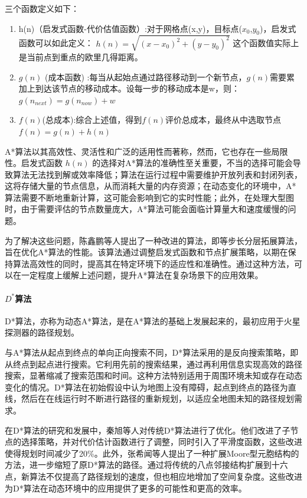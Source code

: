 \documentclass{report}
\begin{document}
三个函数定义如下：
\begin{enumerate}
\item 	h(n)（启发式函数-代价估值函数）:对于网格点(x,y)，目标点($x_0$,$y_0$)，启发式函数可以如此定义： \( h(n)=\sqrt{(x-x_0)^2+(y-y_0)^2} \) 这个函数值实际上是当前点到重点的欧里几得距离。
\item $g(n)$ (成本函数) :每当从起始点通过路径移动到一个新节点，$g(n)$需要累加上到达该节点的移动成本。设每一步的移动成本是w，则：$g(n_{next})=g(n_{now})+w$
  \item  $f(n)$(总成本):综合上述值，得到$f(n)$评价总成本，最终从中选取节点$f(n)=g(n)+h(n)$

  \end{enumerate}

A*算法以其高效性、灵活性和广泛的适用性而著称，然而，它也存在一些局限性。启发式函数 \( h(n) \) 的选择对A*算法的准确性至关重要，不当的选择可能会导致算法无法找到解或效率降低；算法在运行过程中需要维护开放列表和封闭列表，这将存储大量的节点信息，从而消耗大量的内存资源；在动态变化的环境中，A*算法需要不断地重新计算，这可能会影响到它的实时性能；此外，在处理大型图时，由于需要评估的节点数量庞大，A*算法可能会面临计算量大和速度缓慢的问题。

为了解决这些问题，陈鑫鹏等人提出了一种改进的算法，即等步长分层拓展算法，旨在优化A*算法的性能。该算法通过调整启发式函数和节点扩展策略，以期在保持算法高效性的同时，提高其在特定环境下的适应性和准确性。通过这种方法，可以在一定程度上缓解上述问题，提升A*算法在复杂场景下的应用效果\cite{jh3}。

\paragraph{$D^{*}$算法}
D*算法，亦称为动态A*算法，是在A*算法的基础上发展起来的，最初应用于火星探测器的路径规划。

与A*算法从起点到终点的单向正向搜索不同，D*算法采用的是反向搜索策略，即从终点到起点进行搜索。它利用先前的搜索结果，通过再利用信息实现高效的路径搜索，显著缩减了搜索范围和时间。这种方法特别适用于周围环境未知或存在动态变化的情况。D*算法在初始假设中认为地图上没有障碍，起点到终点的路径为直线，然后在在线运行时不断进行路径的重新规划，以适应全地图未知的路径规划需求。

在D*算法的研究和发展中，秦旭等人对传统D*算法进行了优化。他们改进了子节点的选择策略，并对代价估计函数进行了调整，同时引入了平滑度函数，这些改进使得规划时间减少了20\%。此外，张希闻等人提出了一种扩展Moore型元胞结构的方法，进一步缩短了原D*算法的路径。通过将传统的八点邻接结构扩展到十六点，新算法不仅提高了路径规划的速度，但也相应地增加了空间复杂度。这些改进为D*算法在动态环境中的应用提供了更多的可能性和更高的效率\cite{jh4}。
\newpage
\end{document}
